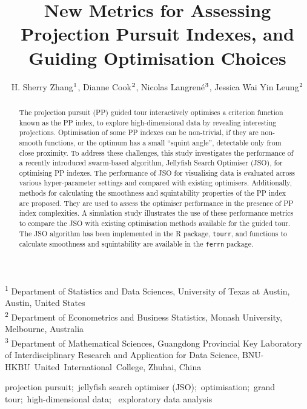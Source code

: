 \documentclass[
  12pt,
]{interact}
\title{New Metrics for Assessing Projection Pursuit Indexes, and Guiding
Optimisation Choices}
\author{H. Sherry Zhang$\textsuperscript{1}$, Dianne
Cook$\textsuperscript{2}$, Nicolas
Langrené$\textsuperscript{3}$, Jessica Wai Yin
Leung$\textsuperscript{2}$}
\theoremstyle{plain}
\begin{document}
\captionsetup{labelsep=space}
\maketitle
\textsuperscript{1} Department of Statistics and Data
Sciences, University of Texas at Austin, Austin, United
States\\ \textsuperscript{2} Department of Econometrics and Business
Statistics, Monash
University, Melbourne, Australia\\ \textsuperscript{3} Department of
Mathematical Sciences, Guangdong Provincial Key Laboratory of
Interdisciplinary Research and Application for Data Science,
BNU-HKBU~United~International~College, Zhuhai, China
\begin{abstract}
The projection pursuit (PP) guided tour interactively optimises a
criterion function known as the PP index, to explore high-dimensional
data by revealing interesting projections. Optimisation of some PP
indexes can be non-trivial, if they are non-smooth functions, or the
optimum has a small ``squint angle'', detectable only from close
proximity. To address these challenges, this study investigates the
performance of a recently introduced swarm-based algorithm, Jellyfish
Search Optimiser (JSO), for optimising PP indexes. The performance of
JSO for visualising data is evaluated across various hyper-parameter
settings and compared with existing optimisers. Additionally, methods
for calculating the smoothness and squintability properties of the PP
index are proposed. They are used to assess the optimiser performance in
the presence of PP index complexities. A simulation study illustrates
the use of these performance metrics to compare the JSO with existing
optimisation methods available for the guided tour. The JSO algorithm
has been implemented in the R package, \texttt{tourr}, and functions to
calculate smoothness and squintability are available in the
\texttt{ferrn} package.
\end{abstract}
\begin{keywords}
\def\sep{;\ }
projection pursuit\sep jellyfish search optimiser
(JSO)\sep optimisation\sep grand tour\sep high-dimensional data\sep 
exploratory data analysis
\end{keywords}
\ifdefined\Shaded\renewenvironment{Shaded}{\begin{tcolorbox}[interior hidden, sharp corners, boxrule=0pt, frame hidden, breakable, borderline west={3pt}{0pt}{shadecolor}, enhanced]}{\end{tcolorbox}}\fi
\end{document}
